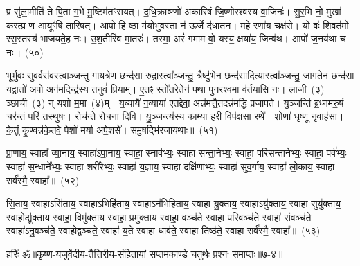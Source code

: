 प्र सु॑ला॒मीति॑ ते पि॒ता ग॒भे मु॒ष्टिम॑तꣳसयत्। द॒धि॒क्राव्ण्णो॑ अकारिषं जि॒ष्णोरश्व॑स्य वा॒जिनः॑। सु॒र॒भि नो॒ मुखा॑ कर॒त्प्र ण॒ आयूꣳ॑षि तारिषत्। आपो॒ हि ष्ठा म॑यो॒भुव॒स्ता न॑ ऊ॒र्जे द॑धातन। म॒हे रणा॑य॒ चक्ष॑से। यो वः॑ शि॒वत॑मो॒ रस॒स्तस्य॑ भाजयते॒ह नः॑। उ॒श॒तीरि॑व मा॒तरः॑। तस्मा॒ अरं॑ गमाम वो॒ यस्य॒ क्षया॑य॒ जिन्व॑थ। आपो॑ ज॒नय॑था च नः॥~(५०)

{\anuvakamend[{आ॒सा॒मत्ति॒ न रो॑हतो॒ जिन्व॑थ च॒त्वारि॑ च}]}%

भूर्भुवः॒ सुव॒र्वस॑वस्त्वाञ्जन्तु गाय॒त्रेण॒ छन्द॑सा रु॒द्रास्त्वा᳚ञ्जन्तु॒ त्रैष्टु॑भेन॒ छन्द॑सादि॒त्यास्त्वा᳚ञ्जन्तु॒ जाग॑तेन॒ छन्द॑सा॒ यद्वातो॑ अ॒पो अग॑म॒दिन्द्र॑स्य त॒नुवं॑ प्रि॒याम्। ए॒तꣴ स्तो॑तरे॒तेन॑ प॒था पुन॒रश्व॒मा व॑र्तयासि नः। लाजी~(३) ञ्छाची~(३) न् यशो॑ म॒मा~(४)म्। य॒व्यायै॑ ग॒व्याया॑ ए॒तद्दे॑वा॒ अन्न॑मत्तै॒तदन्न॑मद्धि प्रजापते। यु॒ञ्जन्ति॑ ब्र॒ध्नम॑रु॒षं चर॑न्तं॒ परि॑ त॒स्थुषः॑। रोच॑न्ते रोच॒ना दि॒वि। यु॒ञ्जन्त्य॑स्य॒ काम्या॒ हरी॒ विप॑क्षसा॒ रथे᳚। शोणा॑ धृ॒ष्णू नृ॒वाह॑सा। के॒तुं कृ॒ण्वन्न॑के॒तवे॒ पेशो॑ मर्या अपे॒शसे᳚। समु॒षद्भि॑रजायथाः॥~(५१)

{\anuvakamend[{ब्र॒ध्नं पञ्च॑विꣳशतिश्च}]}%

प्रा॒णाय॒ स्वाहा᳚ व्या॒नाय॒ स्वाहा॑\-ऽपा॒नाय॒ स्वाहा॒ स्नाव॑भ्यः॒ स्वाहा॑ सन्ता॒नेभ्यः॒ स्वाहा॒ परि॑सन्तानेभ्यः॒ स्वाहा॒ पर्व॑भ्यः॒ स्वाहा॑ स॒न्धाने᳚भ्यः॒ स्वाहा॒ शरी॑रेभ्यः॒ स्वाहा॑ य॒ज्ञाय॒ स्वाहा॒ दक्षि॑णाभ्यः॒ स्वाहा॑ सुव॒र्गाय॒ स्वाहा॑ लो॒काय॒ स्वाहा॒ सर्व॑स्मै॒ स्वाहा᳚॥~(५२)

{\anuvakamend[{प्रा॒णाया॒ष्टाविꣳ॑शतिः}]}%

सि॒ताय॒ स्वाहा\-ऽसि॑ताय॒ स्वाहा॒\-ऽभिहि॑ताय॒ स्वाहा\-ऽन॑भिहिताय॒ स्वाहा॑ यु॒क्ताय॒ स्वाहा\-ऽयु॑क्ताय॒ स्वाहा॒ सुयु॑क्ताय॒ स्वाहोद्यु॑क्ताय॒ स्वाहा॒ विमु॑क्ताय॒ स्वाहा॒ प्रमु॑क्ताय॒ स्वाहा॒ वञ्च॑ते॒ स्वाहा॑ परि॒वञ्च॑ते॒ स्वाहा॑ सं॒वञ्च॑ते॒ स्वाहा॑\-ऽनु॒वञ्च॑ते॒ स्वाहो॒द्वञ्च॑ते॒ स्वाहा॑ य॒ते स्वाहा॒ धाव॑ते॒ स्वाहा॒ तिष्ठ॑ते॒ स्वाहा॒ सर्व॑स्मै॒ स्वाहा᳚॥~(५३)

{\anuvakamend[{सि॒ताया॒ष्टात्रिꣳ॑शत्}]}%

{हरिः॑ ॐ}{॥कृष्ण-यजुर्वेदीय-तैत्तिरीय-संहितायां सप्तमकाण्डे चतुर्थः प्रश्नः समाप्तः॥७-४॥}


